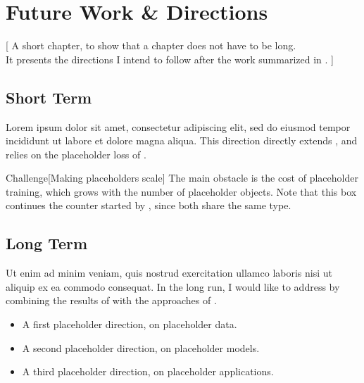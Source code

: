 \chapter[future]{Future Work \& Directions}
 [
  A short chapter, to show that a chapter does not have to be long. \\
  It presents the directions I intend to follow after the work summarized in .
 ]

\section[future_short_term]{Short Term}

Lorem ipsum dolor sit amet, consectetur adipiscing elit, sed do eiusmod tempor incididunt ut labore et dolore magna aliqua.
This direction directly extends \cite{lastname2025preprint}, and relies on the placeholder loss of .

\begin{boxenv}{Challenge}[Making placeholders scale]
    The main obstacle is the cost of placeholder training, which grows with the number of placeholder objects.
    Note that this box continues the counter started by , since both share the same type.
\end{boxenv}

\section[future_long_term]{Long Term}

Ut enim ad minim veniam, quis nostrud exercitation ullamco laboris nisi ut aliquip ex ea commodo consequat.
In the long run, I would like to address  by combining the results of  with the  approaches of \cite{amet2017seminal}.

\begin{itemize}
    \item A first placeholder direction, on placeholder data.
    \item A second placeholder direction, on placeholder models.
    \item A third placeholder direction, on placeholder applications.
\end{itemize}
